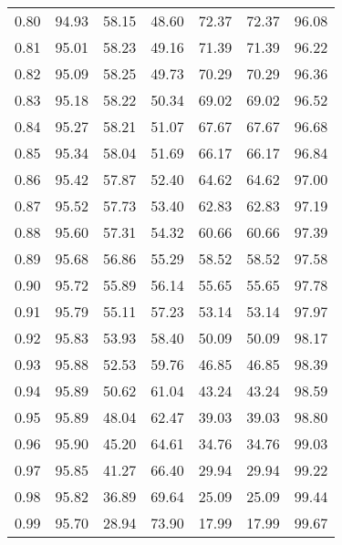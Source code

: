 \begin{tabular}{|c|c|c|c|c|c|c|}
      0.80 &     94.93 &     58.15 &      48.60 &   72.37 &      72.37 &         96.08 \\
      0.81 &     95.01 &     58.23 &      49.16 &   71.39 &      71.39 &         96.22 \\
      0.82 &     95.09 &     58.25 &      49.73 &   70.29 &      70.29 &         96.36 \\
      0.83 &     95.18 &     58.22 &      50.34 &   69.02 &      69.02 &         96.52 \\
      0.84 &     95.27 &     58.21 &      51.07 &   67.67 &      67.67 &         96.68 \\
      0.85 &     95.34 &     58.04 &      51.69 &   66.17 &      66.17 &         96.84 \\
      0.86 &     95.42 &     57.87 &      52.40 &   64.62 &      64.62 &         97.00 \\
      0.87 &     95.52 &     57.73 &      53.40 &   62.83 &      62.83 &         97.19 \\
      0.88 &     95.60 &     57.31 &      54.32 &   60.66 &      60.66 &         97.39 \\
      0.89 &     95.68 &     56.86 &      55.29 &   58.52 &      58.52 &         97.58 \\
      0.90 &     95.72 &     55.89 &      56.14 &   55.65 &      55.65 &         97.78 \\
      0.91 &     95.79 &     55.11 &      57.23 &   53.14 &      53.14 &         97.97 \\
      0.92 &     95.83 &     53.93 &      58.40 &   50.09 &      50.09 &         98.17 \\
      0.93 &     95.88 &     52.53 &      59.76 &   46.85 &      46.85 &         98.39 \\
      0.94 &     95.89 &     50.62 &      61.04 &   43.24 &      43.24 &         98.59 \\
      0.95 &     95.89 &     48.04 &      62.47 &   39.03 &      39.03 &         98.80 \\
      0.96 &     95.90 &     45.20 &      64.61 &   34.76 &      34.76 &         99.03 \\
      0.97 &     95.85 &     41.27 &      66.40 &   29.94 &      29.94 &         99.22 \\
      0.98 &     95.82 &     36.89 &      69.64 &   25.09 &      25.09 &         99.44 \\
      0.99 &     95.70 &     28.94 &      73.90 &   17.99 &      17.99 &         99.67 \\
\bottomrule
\end{tabular}
